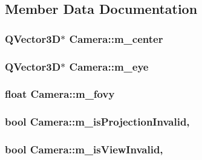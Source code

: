 \subsection{Member Data Documentation}
\hypertarget{class_camera_a7048a9ea478532b36678d4d2d07c6dd6}{
\subsubsection[{m\+\_\+center}]{\setlength{\rightskip}{0pt plus 5cm}Q\+Vector3\+D$\ast$ Camera\+::m\+\_\+center\hspace{0.3cm}{\ttfamily [protected]}}}\label{class_camera_a7048a9ea478532b36678d4d2d07c6dd6}
\hypertarget{class_camera_a227e5fd463e3bea92f376d8a9d7cee7e}{
\subsubsection[{m\+\_\+eye}]{\setlength{\rightskip}{0pt plus 5cm}Q\+Vector3\+D$\ast$ Camera\+::m\+\_\+eye\hspace{0.3cm}{\ttfamily [protected]}}}\label{class_camera_a227e5fd463e3bea92f376d8a9d7cee7e}
\hypertarget{class_camera_ae537e927f6648b6ce7054e0ff54442b9}{
\subsubsection[{m\+\_\+fovy}]{\setlength{\rightskip}{0pt plus 5cm}float Camera\+::m\+\_\+fovy\hspace{0.3cm}{\ttfamily [protected]}}}\label{class_camera_ae537e927f6648b6ce7054e0ff54442b9}
\hypertarget{class_camera_a62264f74f2fb442e8d94e5c0a44098f0}{
\subsubsection[{m\+\_\+is\+Projection\+Invalid}]{\setlength{\rightskip}{0pt plus 5cm}bool Camera\+::m\+\_\+is\+Projection\+Invalid\hspace{0.3cm}{\ttfamily [mutable]}, {\ttfamily [protected]}}}\label{class_camera_a62264f74f2fb442e8d94e5c0a44098f0}
\hypertarget{class_camera_a07a7666a3529761624675f4f1771f1c7}{
\subsubsection[{m\+\_\+is\+View\+Invalid}]{\setlength{\rightskip}{0pt plus 5cm}bool Camera\+::m\+\_\+is\+View\+Invalid\hspace{0.3cm}{\ttfamily [mutable]}, {\ttfamily [protected]}}}\label{class_camera_a07a7666a3529761624675f4f1771f1c7}
